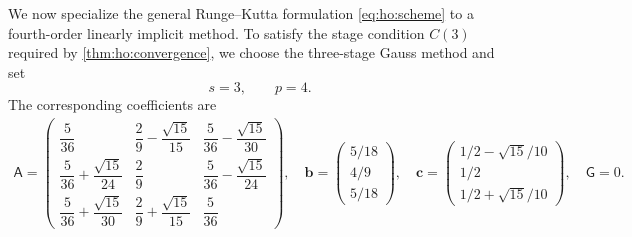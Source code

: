 \documentclass[11pt,a4paper]{article}
\newcommand{\bs}{\boldsymbol}
\theoremstyle{definition}
\numberwithin{equation}{section}
\begin{document}
We now specialize the general Runge--Kutta formulation
\eqref{eq:ho:scheme} to a fourth-order linearly implicit method. To
satisfy the stage condition \(C(3)\) required by
\cref{thm:ho:convergence}, we choose the three-stage Gauss method and
set
\begin{equation}\label{eq:ho:Gauss-four-parameters}
 s=3,\qquad p=4.
\end{equation}
The corresponding coefficients are
\begin{equation}\label{eq:ho:Gauss-three-coefficients}
\begin{gathered}
 \mathsf A=
 \begin{pmatrix}
 \dfrac5{36}
 &
 \dfrac29-\dfrac{\sqrt{15}}{15}
 &
 \dfrac5{36}-\dfrac{\sqrt{15}}{30}
 \\[2mm]
 \dfrac5{36}+\dfrac{\sqrt{15}}{24}
 &
 \dfrac29
 &
 \dfrac5{36}-\dfrac{\sqrt{15}}{24}
 \\[2mm]
 \dfrac5{36}+\dfrac{\sqrt{15}}{30}
 &
 \dfrac29+\dfrac{\sqrt{15}}{15}
 &
 \dfrac5{36}
 \end{pmatrix},\quad
 \bs b=
 \begin{pmatrix}
 5/18\\[1mm]4/9\\[1mm]5/18
 \end{pmatrix},
 \quad
 \bs c=
 \begin{pmatrix}
 1/2-\sqrt{15}/10\\[1mm]
 1/2\\[1mm]
 1/2+\sqrt{15}/10
 \end{pmatrix},
 \quad \mathsf G = 0.
\end{gathered}
\end{equation}
\end{document}
